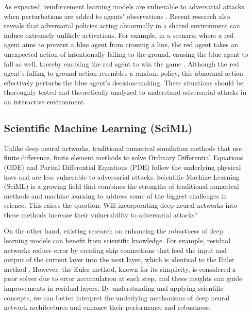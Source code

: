 As expected, reinforcement learning models are vulnerable to adversarial attacks when perturbations are added to agents' observations \citep{chen2019adversarial}. Recent research also reveals that adversarial policies acting abnormally in a shared environment can induce extremely unlikely activations. For example, in a scenario where a red agent aims to prevent a blue agent from crossing a line, the red agent takes an unexpected action of intentionally falling to the ground, causing the blue agent to fall as well, thereby enabling the red agent to win the game \citep{gleave2021adversarial}. Although the red agent's falling-to-ground action resembles a random policy, this abnormal action effectively perturbs the blue agent's decision-making. These situations should be thoroughly tested and theoretically analyzed to understand adversarial attacks in an interactive environment.

\subsection{Scientific Machine Learning (SciML)}

Unlike deep neural networks, traditional numerical simulation methods that use finite difference, finite element methods to solve Ordinary Differential Equations (ODE) and Partial Differential Equations (PDE) follow the underlying physical laws and are less vulnerable to adversarial attacks. Scientific Machine Learning (SciML) is a growing field that combines the strengths of traditional numerical methods and machine learning to address some of the biggest challenges in science. This raises the question: Will incorporating deep neural networks into these methods increase their vulnerability to adversarial attacks? 


On the other hand, existing research on enhancing the robustness of deep learning models can benefit from scientific knowledge. For example, residual networks reduce error by creating skip connections that feed the input and output of the current layer into the next layer, which is identical to the Euler method \citep{chen2018neural}. However, the Euler method, known for its simplicity, is considered a poor solver due to error accumulation at each step, and these insights can guide improvements in residual layers. By understanding and applying scientific concepts, we can better interpret the underlying mechanisms of deep neural network architectures and enhance their performance and robustness.

